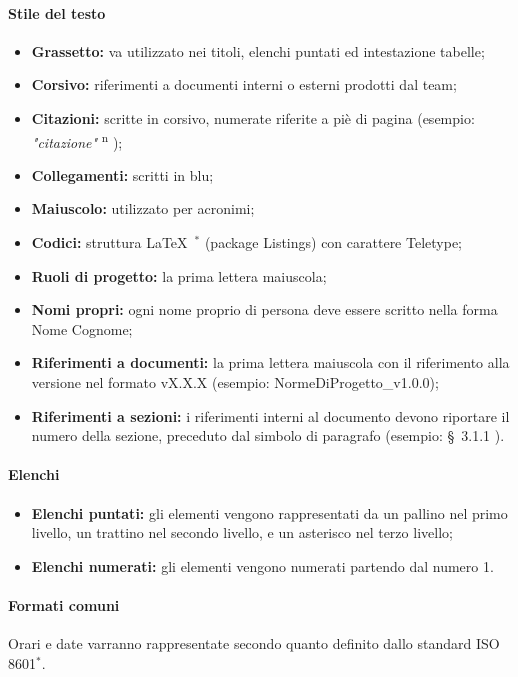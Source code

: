 \documentclass[11pt,a4paper]{article}
\begin{document}
{	\paragraph{Stile del testo}
	\begin{itemize}
		\item \textbf{Grassetto:} va utilizzato nei titoli, elenchi puntati ed intestazione tabelle;
		\item \textbf{Corsivo:} riferimenti a documenti interni o esterni prodotti dal team;
		\item \textbf{Citazioni:} scritte in corsivo, numerate riferite a piè di pagina (esempio: \textit{"citazione"} \textsuperscript{n} );
		\item \textbf{Collegamenti:} scritti in blu;
		\item \textbf{Maiuscolo:} utilizzato per acronimi;
		\item \textbf{Codici:} struttura \LaTeX\ $^*$ (package Listings) con carattere Teletype;
		\item \textbf{Ruoli di progetto:} la prima lettera maiuscola;
		\item \textbf{Nomi propri:} ogni nome proprio di persona deve essere scritto nella forma Nome Cognome;
		\item \textbf{Riferimenti a documenti:} la prima lettera maiuscola con il riferimento alla versione nel formato vX.X.X (esempio: NormeDiProgetto\_v1.0.0);
		\item \textbf{Riferimenti a sezioni:} i riferimenti interni al documento devono riportare il numero della sezione, preceduto dal simbolo di paragrafo (esempio: \S\ {3.1.1} ).
		
	\end{itemize}
	
	
	\paragraph{Elenchi}
	\begin{itemize}
		\item \textbf{Elenchi puntati:} gli elementi vengono rappresentati da un pallino nel primo livello, un trattino nel secondo livello, e un asterisco nel terzo livello; 
		\item \textbf{Elenchi numerati:} gli elementi vengono numerati partendo dal numero 1.
	\end{itemize}
	
	\paragraph{Formati comuni\\}
	Orari e date varranno rappresentate secondo quanto definito dallo standard ISO 8601$^*$. 
	
}
\end{document}
